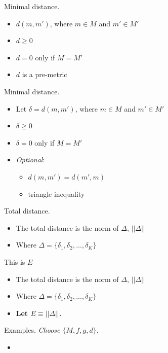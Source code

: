 \documentclass[10pt]{beamer}
\begin{document}
\begin{frame}[fragile]{Minimal distance.}
\begin{itemize}
    \item $d(m,m')$, where $m \in M$ and $m' \in M'$
    \item $d \ge 0$
    \item $d = 0$ only if $M = M'$
    \item \alert{$d$ is a pre-metric}
\end{itemize}
\end{frame}

\begin{frame}[fragile]{Minimal distance.}
\begin{itemize}
    \item Let $\delta = d(m,m')$, where $m \in M$ and $m' \in M'$
    \item $\delta \ge 0$
    \item $\delta = 0$ only if $M = M'$
    \item \textit{Optional}: 
    \begin{itemize}
        \item $d(m,m') = d(m',m)$ 
        \item triangle inequality
    \end{itemize}
    
\end{itemize}
\end{frame}

\begin{frame}[fragile]{Total distance.}
\begin{itemize}
\item The total distance is the norm of $\Delta$, $||\Delta||$
\item Where $\Delta = \{\delta_1, \delta_2,...,\delta_K\}$
\end{itemize}
\end{frame}

\begin{frame}[fragile]{This is $E$}
\begin{itemize}
\item The total distance is the norm of $\Delta$, $||\Delta||$
\item Where $\Delta = \{\delta_1, \delta_2,...,\delta_K\}$
\item \textbf{Let $E \equiv ||\Delta||$.}
\end{itemize}
\end{frame}

\begin{frame}[fragile]{Examples.}
\textit{Choose $\{M, f, g, d\}$}.
\begin{itemize}
    \item 
\end{itemize}
\end{frame}
\end{document}
